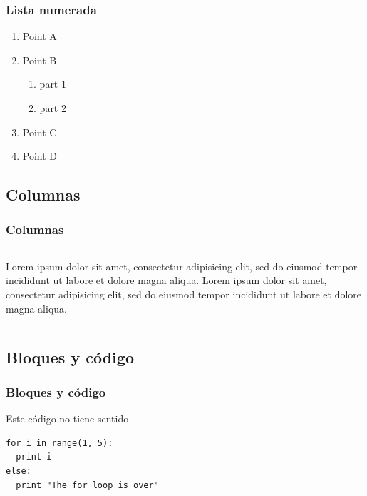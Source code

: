 \documentclass[aspectratio=43]{beamer}
\begin{document}
\begin{frame}
    \frametitle{Lista numerada}
    \begin{enumerate}[I]
    \item Point A
    \item Point B
        \begin{enumerate}[i]
        \item part 1
        \item part 2
        \end{enumerate}
    \item Point C
    \item Point D
    \end{enumerate}    
\end{frame}

\subsection{Columnas}

\begin{frame}
    \frametitle{Columnas}
    \begin{columns}
        Lorem ipsum dolor sit amet, consectetur adipisicing elit, sed do eiusmod tempor incididunt ut labore et dolore magna aliqua.
        Lorem ipsum dolor sit amet, consectetur adipisicing elit, sed do eiusmod tempor incididunt ut labore et dolore magna aliqua.
    \end{columns}
\end{frame}

\subsection{Bloques y código}

\begin{frame}[fragile] %
    \frametitle{Bloques y código}
    \begin{block}{Este código no tiene sentido} %
        \begin{verbatim} 
for i in range(1, 5):
  print i
else:
  print "The for loop is over"
        \end{verbatim}
    \end{block}
\end{frame}
\end{document}
